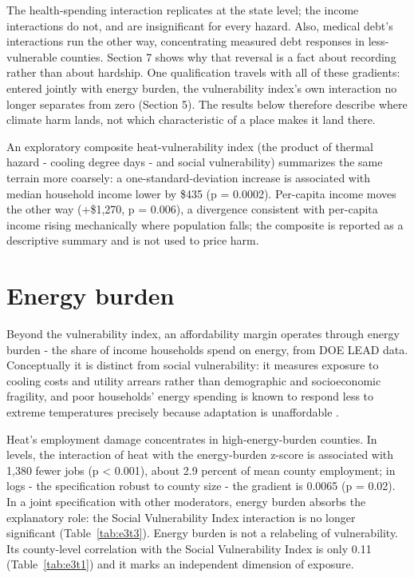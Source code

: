 \documentclass[a4paper,11pt]{article}
\begin{document}
The health-spending interaction replicates at the state level; the income interactions do not, and are insignificant for every hazard. Also, medical debt's interactions run the other way, concentrating measured debt responses in less-vulnerable counties. Section 7 shows why that reversal is a fact about recording rather than about hardship. One qualification travels with all of these gradients: entered jointly with energy burden, the vulnerability index's own interaction no longer separates from zero (Section 5). The results below therefore describe where climate harm lands, not which characteristic of a place makes it land there.

An exploratory composite heat-vulnerability index (the product of thermal hazard - cooling degree days - and social vulnerability) summarizes the same terrain more coarsely: a one-standard-deviation increase is associated with median household income lower by \$435 (p = 0.0002). Per-capita income moves the other way (+\$1,270, p = 0.006), a divergence consistent with per-capita income rising mechanically where population falls; the composite is reported as a descriptive summary and is not used to price harm.

\FloatBarrier
\section{Energy burden}

Beyond the vulnerability index, an affordability margin operates through energy burden - the share of income households spend on energy, from DOE LEAD data. Conceptually it is distinct from social vulnerability: it measures exposure to cooling costs and utility arrears rather than demographic and socioeconomic fragility, and poor households' energy spending is known to respond less to extreme temperatures precisely because adaptation is unaffordable \citep{doremus2022sweating}.

Heat's employment damage concentrates in high-energy-burden counties. In levels, the interaction of heat with the energy-burden z-score is associated with 1,380 fewer jobs (p < 0.001), about 2.9 percent of mean county employment; in logs - the specification robust to county size - the gradient is \textminus{}0.0065 (p = 0.02). In a joint specification with other moderators, energy burden absorbs the explanatory role: the Social Vulnerability Index interaction is no longer significant (Table~\ref{tab:e3t3}). Energy burden is not a relabeling of vulnerability. Its county-level correlation with the Social Vulnerability Index is only 0.11 (Table~\ref{tab:e3t1}) and it marks an independent dimension of exposure.
\end{document}
